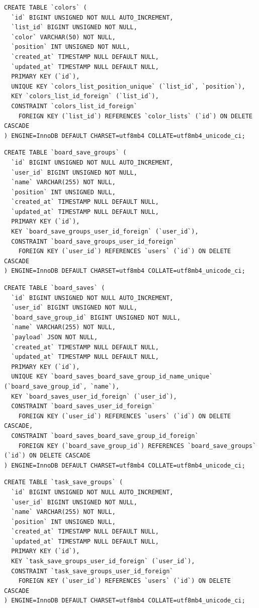 \documentclass{thesis-ekf}
\begin{document}
\begin{lstlisting}[style=mysqlstyle]
CREATE TABLE `colors` (
  `id` BIGINT UNSIGNED NOT NULL AUTO_INCREMENT,
  `list_id` BIGINT UNSIGNED NOT NULL,
  `color` VARCHAR(50) NOT NULL,
  `position` INT UNSIGNED NOT NULL,
  `created_at` TIMESTAMP NULL DEFAULT NULL,
  `updated_at` TIMESTAMP NULL DEFAULT NULL,
  PRIMARY KEY (`id`),
  UNIQUE KEY `colors_list_position_unique` (`list_id`, `position`),
  KEY `colors_list_id_foreign` (`list_id`),
  CONSTRAINT `colors_list_id_foreign`
    FOREIGN KEY (`list_id`) REFERENCES `color_lists` (`id`) ON DELETE CASCADE
) ENGINE=InnoDB DEFAULT CHARSET=utf8mb4 COLLATE=utf8mb4_unicode_ci;
\end{lstlisting}

\begin{lstlisting}[style=mysqlstyle]
CREATE TABLE `board_save_groups` (
  `id` BIGINT UNSIGNED NOT NULL AUTO_INCREMENT,
  `user_id` BIGINT UNSIGNED NOT NULL,
  `name` VARCHAR(255) NOT NULL,
  `position` INT UNSIGNED NULL,
  `created_at` TIMESTAMP NULL DEFAULT NULL,
  `updated_at` TIMESTAMP NULL DEFAULT NULL,
  PRIMARY KEY (`id`),
  KEY `board_save_groups_user_id_foreign` (`user_id`),
  CONSTRAINT `board_save_groups_user_id_foreign`
    FOREIGN KEY (`user_id`) REFERENCES `users` (`id`) ON DELETE CASCADE
) ENGINE=InnoDB DEFAULT CHARSET=utf8mb4 COLLATE=utf8mb4_unicode_ci;
\end{lstlisting}

\begin{lstlisting}[style=mysqlstyle]
CREATE TABLE `board_saves` (
  `id` BIGINT UNSIGNED NOT NULL AUTO_INCREMENT,
  `user_id` BIGINT UNSIGNED NOT NULL,
  `board_save_group_id` BIGINT UNSIGNED NOT NULL,
  `name` VARCHAR(255) NOT NULL,
  `payload` JSON NOT NULL,
  `created_at` TIMESTAMP NULL DEFAULT NULL,
  `updated_at` TIMESTAMP NULL DEFAULT NULL,
  PRIMARY KEY (`id`),
  UNIQUE KEY `board_saves_board_save_group_id_name_unique` (`board_save_group_id`, `name`),
  KEY `board_saves_user_id_foreign` (`user_id`),
  CONSTRAINT `board_saves_user_id_foreign`
    FOREIGN KEY (`user_id`) REFERENCES `users` (`id`) ON DELETE CASCADE,
  CONSTRAINT `board_saves_board_save_group_id_foreign`
    FOREIGN KEY (`board_save_group_id`) REFERENCES `board_save_groups` (`id`) ON DELETE CASCADE
) ENGINE=InnoDB DEFAULT CHARSET=utf8mb4 COLLATE=utf8mb4_unicode_ci;
\end{lstlisting}

\begin{lstlisting}[style=mysqlstyle]
CREATE TABLE `task_save_groups` (
  `id` BIGINT UNSIGNED NOT NULL AUTO_INCREMENT,
  `user_id` BIGINT UNSIGNED NOT NULL,
  `name` VARCHAR(255) NOT NULL,
  `position` INT UNSIGNED NULL,
  `created_at` TIMESTAMP NULL DEFAULT NULL,
  `updated_at` TIMESTAMP NULL DEFAULT NULL,
  PRIMARY KEY (`id`),
  KEY `task_save_groups_user_id_foreign` (`user_id`),
  CONSTRAINT `task_save_groups_user_id_foreign`
    FOREIGN KEY (`user_id`) REFERENCES `users` (`id`) ON DELETE CASCADE
) ENGINE=InnoDB DEFAULT CHARSET=utf8mb4 COLLATE=utf8mb4_unicode_ci;
\end{lstlisting}
\end{document}
